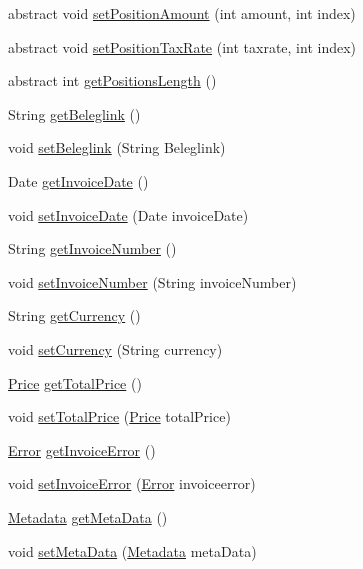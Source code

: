 \begin{DoxyCompactItemize}
\item 
abstract void \hyperlink{class_reduced_invoice_1_1_a_invoice_aef6af27bf12024c16e8e5890243825eb}{set\-Position\-Amount} (int amount, int index)
\item 
abstract void \hyperlink{class_reduced_invoice_1_1_a_invoice_a5919a1c5d917fc62d654441f582f470e}{set\-Position\-Tax\-Rate} (int taxrate, int index)
\item 
abstract int \hyperlink{class_reduced_invoice_1_1_a_invoice_a109ff7a484de183356ebe38737556f11}{get\-Positions\-Length} ()
\item 
String \hyperlink{class_reduced_invoice_1_1_a_invoice_a5485e16d8fb71ba03b5a6e0038378571}{get\-Beleglink} ()
\item 
void \hyperlink{class_reduced_invoice_1_1_a_invoice_a9cc659ce652bcf8870e932ada4675e53}{set\-Beleglink} (String Beleglink)
\item 
Date \hyperlink{class_reduced_invoice_1_1_a_invoice_ac78ce56c3ae003ca87e8144546d7ec3f}{get\-Invoice\-Date} ()
\item 
void \hyperlink{class_reduced_invoice_1_1_a_invoice_adefa18f4aec87c1d4b89233baf6ce9ee}{set\-Invoice\-Date} (Date invoice\-Date)
\item 
String \hyperlink{class_reduced_invoice_1_1_a_invoice_a09231d505794762ea8f363e4689392c8}{get\-Invoice\-Number} ()
\item 
void \hyperlink{class_reduced_invoice_1_1_a_invoice_a20d784a1da556e7bb3c5538c5a6701c4}{set\-Invoice\-Number} (String invoice\-Number)
\item 
String \hyperlink{class_reduced_invoice_1_1_a_invoice_a2c0175f8fdd6c21504bdf6f8e3336cc2}{get\-Currency} ()
\item 
void \hyperlink{class_reduced_invoice_1_1_a_invoice_a83a6ba629194d28ea32c24275d0e14ba}{set\-Currency} (String currency)
\item 
\hyperlink{class_reduced_invoice_1_1_price}{Price} \hyperlink{class_reduced_invoice_1_1_a_invoice_aedc84169ce345d6f7c72b808c305c27b}{get\-Total\-Price} ()
\item 
void \hyperlink{class_reduced_invoice_1_1_a_invoice_ac5c395d78cb3bd54e8e40678bdb46bf0}{set\-Total\-Price} (\hyperlink{class_reduced_invoice_1_1_price}{Price} total\-Price)
\item 
\hyperlink{enum_reduced_invoice_1_1_a_invoice_1_1_error}{Error} \hyperlink{class_reduced_invoice_1_1_a_invoice_ac6335f5b80ba3514a205e46c7170ae5c}{get\-Invoice\-Error} ()
\item 
void \hyperlink{class_reduced_invoice_1_1_a_invoice_a625c87b0ecdcbf896e66e4ad1fe31681}{set\-Invoice\-Error} (\hyperlink{enum_reduced_invoice_1_1_a_invoice_1_1_error}{Error} invoiceerror)
\item 
\hyperlink{class_reduced_invoice_1_1_metadata}{Metadata} \hyperlink{class_reduced_invoice_1_1_a_invoice_a27064d52b653a15a81485e72b54fd687}{get\-Meta\-Data} ()
\item 
void \hyperlink{class_reduced_invoice_1_1_a_invoice_a67f0ef58970f9aff38098d079e738596}{set\-Meta\-Data} (\hyperlink{class_reduced_invoice_1_1_metadata}{Metadata} meta\-Data)
\end{DoxyCompactItemize}
